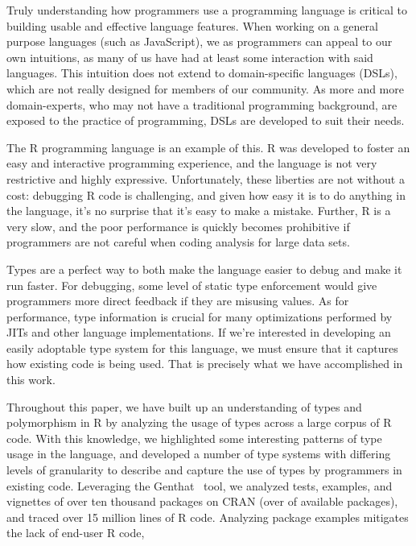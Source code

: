 \documentclass[acmsmall,10pt,review,anonymous]{acmart}\settopmatter{printfolios=true,printccs=false,printacmref=false}
\newcommand{\genthat}{{\sc Genthat}\xspace}
\begin{document}
Truly understanding how programmers use a programming language is critical to building usable and effective language features.
When working on a general purpose languages (such as JavaScript), we as programmers can appeal to our own intuitions, as many of us have had at least some interaction with said languages.
This intuition does not extend to domain-specific languages (DSLs), which are not really designed for members of our community.
As more and more domain-experts, who may not have a traditional programming background, are exposed to the practice of programming, DSLs are developed to suit their needs.

The R programming language is an example of this.
R was developed to foster an easy and interactive programming experience, and the language is not very restrictive and highly expressive.
Unfortunately, these liberties are not without a cost: debugging R code is challenging, and given how easy it is to do anything in the language, it's no surprise that it's easy to make a mistake.
Further, R is a very slow, and the poor performance is quickly becomes prohibitive if programmers are not careful when coding analysis for large data sets.

Types are a perfect way to both make the language easier to debug and make it run faster.
For debugging, some level of static type enforcement would give programmers more direct feedback if they are misusing values.
As for performance, type information is crucial for many optimizations performed by JITs and other language implementations.
If we're interested in developing an easily adoptable type system for this language, we must ensure that it captures how existing code is being used.
That is precisely what we have accomplished in this work.

Throughout this paper, we have built up an understanding of types and polymorphism in R by analyzing the usage of types across a large corpus of R code.
With this knowledge, we highlighted some interesting patterns of type usage in the language, and developed a number of type systems with differing levels of granularity to describe and capture the use of types by programmers in existing code.
Leveraging the \genthat~\cite{issta18} tool, we analyzed tests, examples, and vignettes of over ten thousand packages on CRAN (over \PERCENTCRAN of available packages), and traced over 15 million lines of R code.
Analyzing package examples mitigates the lack of end-user R code, 

\end{document}
